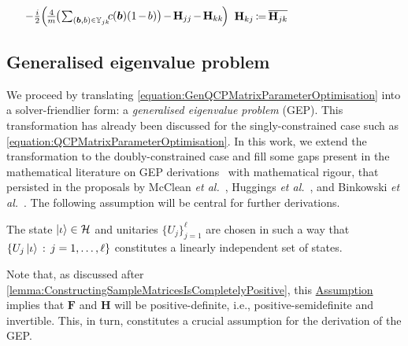 \documentclass[10pt,conference]{IEEEtran}
\newcommand*{\hil}{\mathcal{H}}       %
\newcommand*{\defcolon}{\,:\,}        %
\newcommand*{\scriptin}{\raisebox{0.15ex}{$\scriptscriptstyle \in$}}
\begin{document}
\begin{algorithm}
{{            $\quad\ \ - \frac{i}{2}\Big(\hspace*{-1pt}\frac{4}{m}\hspace*{-1pt} \big(\hspace*{-1pt}\sum_{(\bm{b}, b) \scriptin \mathbb{Y}_{j k}}\hspace*{-4pt} c(\bm{b}) (1\hspace*{-1pt} -\hspace*{-1pt} b)\big)\hspace*{-1pt} -\hspace*{-1pt} \mathbf{H}_{j j}\hspace*{-1pt} -\hspace*{-1pt} \mathbf{H}_{k k}\hspace*{-1pt}\Big)$\;
            $\mathbf{H}_{k j}\hspace*{-1pt} \coloneqq\hspace*{-1pt} \overline{\mathbf{H}_{j k}}$\;
        }
    }
    \;
\end{algorithm}


\subsection{\label{subsection:GeneralisedEigenvalueProblem}Generalised eigenvalue problem}

We proceed by translating \eqref{equation:GenQCPMatrixParameterOptimisation} into a solver-friendlier form: a \emph{generalised eigenvalue problem} (GEP).
This transformation has already been discussed for the singly-constrained case such as \eqref{equation:QCPMatrixParameterOptimisation}.
In this work, we extend the transformation to the doubly-constrained case and fill some gaps present in the mathematical literature on GEP derivations~\cite{Ghojogh2019EigenvalueAndGeneralizedEigenvalueProblemsTutorial} with mathematical rigour, that persisted in the proposals by McClean \textit{et al.}~\cite{Mcclean2017HybridQuantumClassicalHierarchyForMitigationOfDecoherenceAndDeterminationOfExcitedStates}, Huggings \textit{et al.}~\cite{Huggins2020ANonOrthogonalVariationalQuantumEigensolver}, and Binkowski \textit{et al.}~\cite{Binkowski2025FromBarrenPlateausThroughFertileValleysConicExtensionsOfParameterisedQuantumCircuits}.
The following assumption will be central for further derivations.
\begin{assumption}\label{assumption:LinearIndependence}
    The state $\ket{\iota} \in \hil$ and unitaries $\{U_{j}\}_{j = 1}^{\ell}$ are chosen in such a way that $\{U_{j} \ket{\iota} \defcolon j = 1, \ldots, \ell\}$ constitutes a linearly independent set of states.
\end{assumption}
Note that, as discussed after \autoref{lemma:ConstructingSampleMatricesIsCompletelyPositive}, this \hyperref[assumption:LinearIndependence]{Assumption} implies that $\mathbf{F}$ and $\mathbf{H}$ will be positive-definite, i.e., positive-semidefinite and invertible.
This, in turn, constitutes a crucial assumption for the derivation of the GEP.
\end{document}
